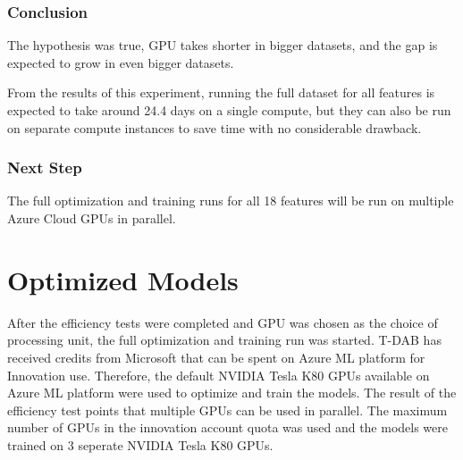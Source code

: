 \documentclass[12pt,twoside]{report}
\begin{document}
\subsubsection{Conclusion}
The hypothesis was true, GPU takes shorter in bigger datasets, and the gap is expected to grow in even bigger datasets.

From the results of this experiment, running the full dataset for all features is expected to take around 24.4 days on a single compute, but they can also be run on separate compute instances to save time with no considerable drawback.

\subsubsection{Next Step}
The full optimization and training runs for all 18 features will be run on multiple Azure Cloud GPUs in parallel.

\section{Optimized Models}

After the efficiency tests were completed and GPU was chosen as the choice of processing unit, the full optimization and training run was started. T-DAB has received credits from Microsoft that can be spent on Azure ML platform for Innovation use. Therefore, the default NVIDIA Tesla K80 GPUs available on Azure ML platform were used to optimize and train the models. The result of the efficiency test points that multiple GPUs can be used in parallel. The maximum number of GPUs in the innovation account quota was used and the models were trained on 3 seperate NVIDIA Tesla K80 GPUs.
\end{document}
